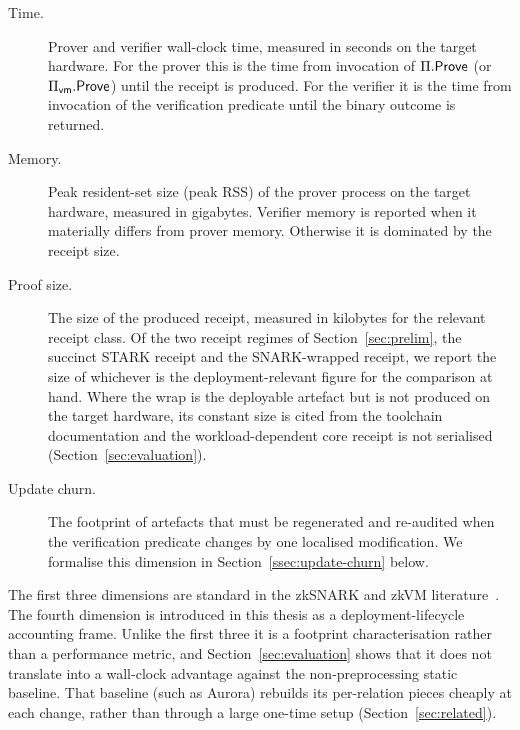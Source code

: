 \begin{description}
  \item[Time.] Prover and verifier wall-clock time, measured in seconds on the target hardware. For the prover this is the time from invocation of $\Pi.\mathsf{Prove}$ (or $\Pi_{\mathsf{vm}}.\mathsf{Prove}$) until the receipt is produced. For the verifier it is the time from invocation of the verification predicate until the binary outcome is returned.
  \item[Memory.] Peak resident-set size (peak RSS) of the prover process on the target hardware, measured in gigabytes. Verifier memory is reported when it materially differs from prover memory. Otherwise it is dominated by the receipt size.
  \item[Proof size.] The size of the produced receipt, measured in kilobytes for the relevant receipt class. Of the two receipt regimes of Section~\ref{sec:prelim}, the succinct STARK receipt and the SNARK-wrapped receipt, we report the size of whichever is the deployment-relevant figure for the comparison at hand. Where the wrap is the deployable artefact but is not produced on the target hardware, its constant size is cited from the toolchain documentation and the workload-dependent core receipt is not serialised (Section~\ref{sec:evaluation}).
  \item[Update churn.] The footprint of artefacts that must be regenerated and re-audited when the verification predicate changes by one localised modification. We formalise this dimension in Section~\ref{ssec:update-churn} below.
\end{description}

The first three dimensions are standard in the zkSNARK and zkVM literature~\cite{cryptoeprint:2024/868,10.1007/978-981-95-2961-2_6,bruestle2023risczero,succinct2024sp1,cryptoeprint:2023/1217}. The fourth dimension is introduced in this thesis as a deployment-lifecycle accounting frame. Unlike the first three it is a footprint characterisation rather than a performance metric, and Section~\ref{sec:evaluation} shows that it does not translate into a wall-clock advantage against the non-preprocessing static baseline. That baseline (such as Aurora) rebuilds its per-relation pieces cheaply at each change, rather than through a large one-time setup (Section~\ref{sec:related}).

